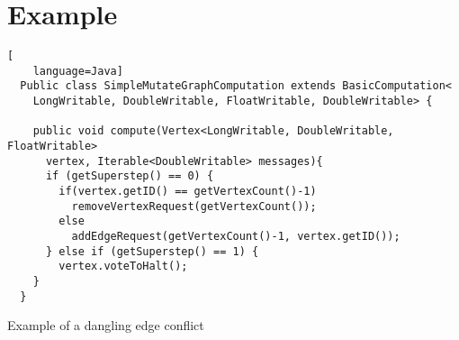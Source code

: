 \section{Example}
\begin{frame}[fragile]
\begin{lstlisting}[
    language=Java]
  Public class SimpleMutateGraphComputation extends BasicComputation<
    LongWritable, DoubleWritable, FloatWritable, DoubleWritable> {

    public void compute(Vertex<LongWritable, DoubleWritable, FloatWritable>
      vertex, Iterable<DoubleWritable> messages){
      if (getSuperstep() == 0) {
        if(vertex.getID() == getVertexCount()-1)
          removeVertexRequest(getVertexCount());
        else
          addEdgeRequest(getVertexCount()-1, vertex.getID());
      } else if (getSuperstep() == 1) {
        vertex.voteToHalt();
    }
  }
\end{lstlisting}
Example of a dangling edge conflict
\end{frame}
